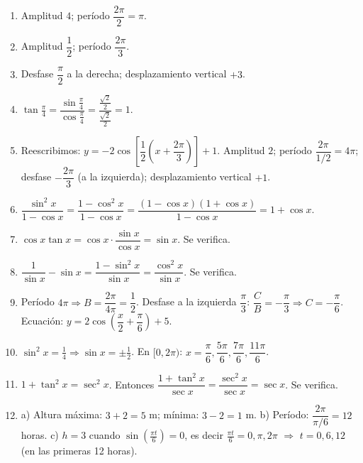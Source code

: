 \documentclass[12pt, letterpaper]{article}
\begin{document}
  \begin{enumerate}[resume=respuestas, leftmargin=*, label=\textbf{\arabic*.}]
    \item Amplitud $4$; período $\dfrac{2\pi}{2} = \pi$.
    \item Amplitud $\dfrac{1}{2}$; período $\dfrac{2\pi}{3}$.
    \item Desfase $\dfrac{\pi}{2}$ a la derecha; desplazamiento vertical $+3$.
    \item $\tan\frac{\pi}{4} = \dfrac{\sin\frac{\pi}{4}}{\cos\frac{\pi}{4}} = \dfrac{\frac{\sqrt{2}}{2}}{\frac{\sqrt{2}}{2}} = 1$.
    \item Reescribimos: $y = -2\cos\left[\dfrac{1}{2}\left(x + \dfrac{2\pi}{3}\right)\right] + 1$. Amplitud $2$; período $\dfrac{2\pi}{1/2} = 4\pi$; desfase $-\dfrac{2\pi}{3}$ (a la izquierda); desplazamiento vertical $+1$.
    \item $\dfrac{\sin^2 x}{1 - \cos x} = \dfrac{1 - \cos^2 x}{1 - \cos x} = \dfrac{(1 - \cos x)(1 + \cos x)}{1 - \cos x} = 1 + \cos x$.
    \item $\cos x \tan x = \cos x \cdot \dfrac{\sin x}{\cos x} = \sin x$. Se verifica.
    \item $\dfrac{1}{\sin x} - \sin x = \dfrac{1 - \sin^2 x}{\sin x} = \dfrac{\cos^2 x}{\sin x}$. Se verifica.
    \item Período $4\pi \Rightarrow B = \dfrac{2\pi}{4\pi} = \dfrac{1}{2}$. Desfase a la izquierda $\dfrac{\pi}{3}$: $\dfrac{C}{B} = -\dfrac{\pi}{3} \Rightarrow C = -\dfrac{\pi}{6}$. Ecuación: $y = 2\cos\left(\dfrac{x}{2} + \dfrac{\pi}{6}\right) + 5$.
    \item $\sin^2 x = \frac{1}{4} \Rightarrow \sin x = \pm \frac{1}{2}$. En $[0, 2\pi)$: $x = \dfrac{\pi}{6}, \dfrac{5\pi}{6}, \dfrac{7\pi}{6}, \dfrac{11\pi}{6}$.
    \item $1 + \tan^2 x = \sec^2 x$. Entonces $\dfrac{1 + \tan^2 x}{\sec x} = \dfrac{\sec^2 x}{\sec x} = \sec x$. Se verifica.
    \item a) Altura máxima: $3 + 2 = 5$ m; mínima: $3 - 2 = 1$ m. \quad b) Período: $\dfrac{2\pi}{\pi/6} = 12$ horas. \quad c) $h = 3$ cuando $\sin\left(\frac{\pi t}{6}\right) = 0$, es decir $\frac{\pi t}{6} = 0, \pi, 2\pi$ $\Rightarrow$ $t = 0, 6, 12$ (en las primeras 12 horas).
  \end{enumerate}


\end{document}
